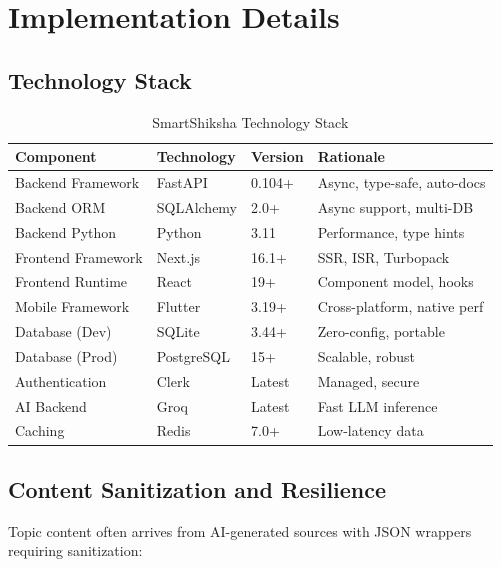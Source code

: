 \documentclass[10pt,conference,compsocconf]{IEEEtran}
\begin{document}
\section{Implementation Details}
\label{sec:implementation}

\subsection{Technology Stack}

\begin{table}[h]
\centering
\caption{SmartShiksha Technology Stack}
\label{tab:tech_stack}
\small
\begin{tabular}{|l|l|l|l|}
\hline
\textbf{Component} & \textbf{Technology} & \textbf{Version} & \textbf{Rationale} \\
\hline
Backend Framework & FastAPI & 0.104+ & Async, type-safe, auto-docs \\
Backend ORM & SQLAlchemy & 2.0+ & Async support, multi-DB \\
Backend Python & Python & 3.11 & Performance, type hints \\
Frontend Framework & Next.js & 16.1+ & SSR, ISR, Turbopack \\
Frontend Runtime & React & 19+ & Component model, hooks \\
Mobile Framework & Flutter & 3.19+ & Cross-platform, native perf \\
Database (Dev) & SQLite & 3.44+ & Zero-config, portable \\
Database (Prod) & PostgreSQL & 15+ & Scalable, robust \\
Authentication & Clerk & Latest & Managed, secure \\
AI Backend & Groq & Latest & Fast LLM inference \\
Caching & Redis & 7.0+ & Low-latency data \\
\hline
\end{tabular}
\end{table}

\subsection{Content Sanitization and Resilience}

Topic content often arrives from AI-generated sources with JSON wrappers requiring sanitization:
\end{document}
